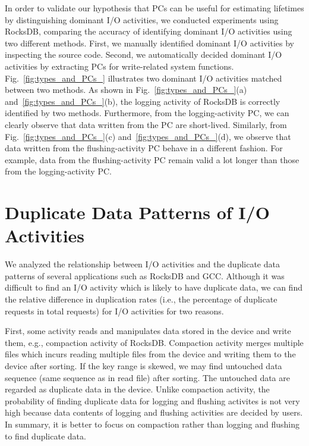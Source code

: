 In order to validate our hypothesis that PCs can be useful for estimating 
lifetimes by distinguishing dominant I/O activities, we conducted experiments
using RocksDB, comparing the accuracy of identifying dominant I/O activities
using two different methods.  First, we manually identified dominant I/O
activities by inspecting the source code. Second, we automatically decided
dominant I/O activities by extracting PCs for write-related system functions.
Fig.~\ref{fig:types_and_PCs_} illustrates two dominant I/O activities matched
between two methods.   As shown in Fig.~\ref{fig:types_and_PCs_}(a)
and~\ref{fig:types_and_PCs_}(b), the logging activity of RocksDB is correctly
identified by two methods.  Furthermore, from the logging-activity PC, we can
clearly observe that data written from the PC are short-lived. Similarly,
from Fig.~\ref{fig:types_and_PCs_}(c) and~\ref{fig:types_and_PCs_}(d), we observe
that data written from the flushing-activity PC behave in a different fashion.
For example, data from the flushing-activity PC remain valid a lot longer than
those from the logging-activity PC.

\section{Duplicate Data Patterns of I/O Activities}
\label{sec:duplicateactivity}
We analyzed the relationship between I/O activities and the duplicate data patterns of several applications
such as RocksDB and GCC.
Although it was difficult to find an I/O activity which is likely to have duplicate data,
we can find the relative difference in duplication rates (i.e., the percentage
of duplicate requests in total requests) for I/O activities for two reasons.

First, some activity reads and manipulates data stored in the device and write them, e.g., compaction 
activity of RocksDB.
Compaction activity merges multiple files which incurs 
reading multiple files from the device and writing them to the device after sorting.
If the key range is skewed, we may find untouched data sequence (same sequence as in read file)
after sorting.
The untouched data are regarded as duplicate data in the device.
Unlike compaction activity, the probability of finding duplicate data for logging and flushing activites is not very high
because data contents of logging and flushing activities are decided by users.
In summary, it is better to focus on compaction rather than logging and flushing to find duplicate data.


